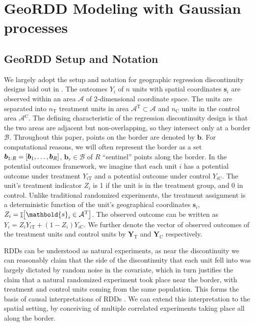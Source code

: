 \documentclass[letter]{article}
\DeclarePairedDelimiter{\curlybracket}{\lbrack}{\rbrack}
\newcommand{\cbr}[1]{\curlybracket*{#1}}
\DeclareMathOperator{\Ind}{\mathbb{I}}
\newcommand{\area}{\mathcal{A}}
\newcommand{\treat}{\mathrm{T}}
\newcommand{\ctrol}{\mathrm{C}}
\newcommand{\treatind}{Z}
\newcommand{\treatarea}{\area{}^{\treat}}
\newcommand{\ctrolarea}{\area{}^{\ctrol}}
\newcommand{\svec}{\mathbold{s}}
\newcommand{\Yvec}{\mathbold{Y}}
\newcommand{\yt}{\Yvec_{\treat}}
\newcommand{\yc}{\Yvec_{\ctrol}}
\newcommand{\border}{\mathcal{B}}
\newcommand{\sentinel}{\bm{b}}
\newcommand{\numsent}{R}
\newcommand{\sentinels}{\sentinel_{1:\numsent}}
\newcommand{\isent}{r}
\newcommand{\sentinelset}{\cbr{\sentinel_1,\ldots,\sentinel_\numsent}}
\renewcommand{\cite}[1]{\citet{#1}}
\begin{document}
    	\section{GeoRDD Modeling with Gaussian processes}\label{geordd-modeling-with-gaussian-processes}

\label{sec:geordd_model}

\subsection{GeoRDD Setup and Notation}\label{geordd-setup-and-notation}

We largely adopt the setup and notation for geographic regression discontinuity designs laid out in \cite{keele_titiunik_2015}.
The outcomes \(Y_i\) of \(n\) units with spatial coordinates \(\svec_i\) are observed within an area \(\area\) of 2-dimensional coordinate space.
The units are separated into \(n_\treat\) treatment units in area \(\treatarea \subset \area\)
and \(n_\ctrol\) units in the control area \(\ctrolarea\).
The defining characteristic of the regression discontinuity design is that the two areas are adjacent but non-overlapping, so they intersect only at a border \(\border\).
Throughout this paper, points on the border are denoted by \(\sentinel\).
For computational reasons, we will often represent the border as a set \(\sentinels=\sentinelset\), \(\sentinel_\isent \in \border\) of \(\numsent\) ``sentinel'' points along the border.
In the potential outcomes framework, we imagine that each unit \(i\) has a potential outcome under treatment \(Y_{i\treat}\) and a potential outcome under control \(Y_{i\ctrol}\).
The unit's treatment indicator \(\treatind_i\) is 1 if the unit is in the treatment group, and 0 in control.
Unlike traditional randomized experiments, the treatment assignment is a deterministic function of the unit's geographical coordinates \(\svec_i\), \(\treatind_i = \Ind\cbr{\svec_i \in \treatarea}\).
The observed outcome can be written as \(Y_i = \treatind_i Y_{i\treat} + (1 - \treatind_i) Y_{i\ctrol}\).
We further denote the vector of observed outcomes of the treatment units and control units by \(\yt\) and \(\yc\) respectively.
    


    	RDDs can be understood as natural experiments, as near the discontinuity we can reasonably claim that the side of the discontinuity that each unit fell into was largely dictated by random noise in the covariate, which in turn justifies the claim that a natural randomized experiment took place near the border, with treatment and control units coming from the same population.
This forms the basis of causal interpretations of RDDs \citep[see for example][chapter 3]{dunning2012natural}.
We can extend this interpretation to the spatial setting, by conceiving of multiple correlated experiments taking place all along the border.
    
\end{document}
